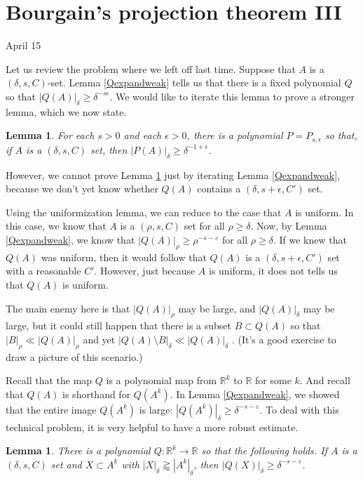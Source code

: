 \documentclass[12pt]{amsart}
\newtheorem{lemma}[theorem]{Lemma}
\newcommand{\RR}{\mathbb{R}}
\newcommand{\eps}{\epsilon}
\begin{document}
\newpage

\section{Bourgain's projection theorem III}

April 15

Let us review the problem where we left off last time.   Suppose that $A$ is a $(\delta,s,C)$-set.   Lemma \ref{Qexpandweak} tells us that there is a fixed polynomial $Q$ so that $|Q(A)|_\delta \ge \delta^{-s \epsilon}$.  
 We would like to iterate this lemma to prove a stronger lemma,  which we now state.
 
\begin{lemma} \label{Qexpandstrong}
For each $s > 0$ and each $\eps >0$,  there is a polynomial $P = P_{s, \epsilon}$ so that,  if $A$ is a $(\delta, s, C)$ set, then $|P(A)|_{\delta} \geq \delta^{-1 + \epsilon}$.   
\end{lemma} 
 
However,  we cannot prove Lemma \ref{Qexpandstrong} just by iterating Lemma \ref{Qexpandweak}, because
we don't yet know whether $Q(A)$ contains a $(\delta,  s+\epsilon,  C')$ set.  

Using the uniformization lemma,  we can reduce to the case that $A$ is uniform.   In this case,  we know that $A$ is a $(\rho, s, C)$ set for all $\rho \ge \delta$.   Now,  by Lemma \ref{Qexpandweak},  we know that
$|Q(A)|_\rho \geq \rho^{-s-\varepsilon}$ for all $\rho \ge \delta$.   If we knew that $Q(A)$ was uniform,  then it would follow that $Q(A)$ is a $(\delta,  s+ \epsilon, C')$ set with a reasonable $C'$.   However,  just because $A$ is uniform,  it does not tells us that $Q(A)$ is uniform.   

The main enemy here is that $|Q(A)|_\rho$ may be large,  and $|Q(A)|_\delta$ may be large,  but it could still happen that there is a subset $B \subset Q(A)$ so that $|B|_\rho \ll |Q(A)|_\rho$  and yet $|Q(A) \setminus B|_\delta \ll |Q(A)|_\delta$ .   (It's a good exercise to draw a picture of this scenario.)

Recall that the map $Q$ is a polynomial map from $\RR^k$ to $\RR$ for some $k$.   And recall that $Q(A)$ is shorthand for $Q(A^k)$.   In Lemma \ref{Qexpandweak},  we showed that the entire image $Q(A^k)$ is large: $|Q(A^k)|_\delta \ge \delta^{-s - \varepsilon}$.   To deal with this technical problem,  it is very helpful to have a more robust estimate.  

\begin{lemma} \label{Qexpandrobust} There is a polynomial $Q: \RR^k \rightarrow \RR$ so that the following holds.
If $A$ is a $(\delta, s, C)$ set and $X \subset A^k$ with $|X|_\delta \gtrapprox |A^k|_\delta$,  then $|Q(X)|_\delta \ge \delta^{- s - \varepsilon}$.  
\end{lemma}
\end{document}
